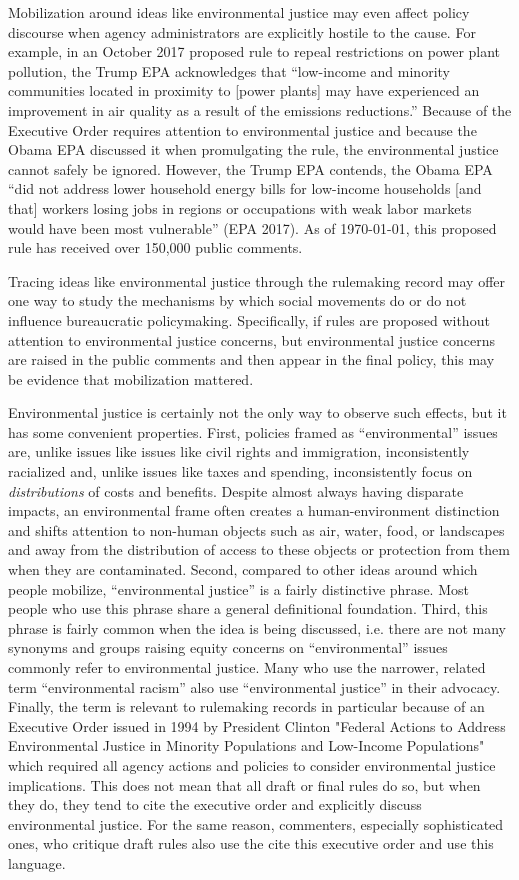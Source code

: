 Mobilization around ideas like environmental justice may even affect policy discourse when agency administrators are explicitly hostile to the cause. For example, in an October 2017 proposed rule to repeal restrictions on power plant pollution, the Trump EPA acknowledges that ``low-income and minority communities located in proximity to [power plants] may have experienced an improvement in air quality as a result of the emissions reductions.'' Because of the Executive Order requires attention to environmental justice and because the Obama EPA discussed it when promulgating the rule, the environmental justice cannot safely be ignored. However,  the Trump EPA contends, the Obama EPA ``did not address lower household energy bills for low-income households [and that] workers losing jobs in regions or occupations with weak labor markets would have been most vulnerable'' (EPA 2017). As of \today, this proposed rule has received over 150,000 public comments. 

Tracing ideas like environmental justice through the rulemaking record may offer one way to study the mechanisms by which social movements do or do not influence bureaucratic policymaking. Specifically, if rules are proposed without attention to environmental justice concerns, but environmental justice concerns are raised in the public comments and then appear in the final policy, this may be evidence that mobilization mattered.

Environmental justice is certainly not the only way to observe such effects, but it has some convenient properties. First, policies framed as ``environmental'' issues are, unlike issues like issues like civil rights and immigration, inconsistently racialized and, unlike issues like taxes and spending, inconsistently focus on \textit{distributions} of costs and benefits. Despite almost always having disparate impacts, an environmental frame often creates a human-environment distinction and shifts attention to non-human objects such as air, water, food, or landscapes and away from the distribution of access to these objects or protection from them when they are contaminated. Second, compared to other ideas around which people mobilize, ``environmental justice'' is a fairly distinctive phrase. Most people who use this phrase share a general definitional foundation. Third, this phrase is fairly common when the idea is being discussed, i.e. there are not many synonyms and groups raising equity concerns on ``environmental'' issues commonly refer to environmental justice.  Many who use the narrower, related term ``environmental racism'' also use ``environmental justice'' in their advocacy.  Finally, the term is relevant to rulemaking records in particular because of an Executive Order issued in 1994 by President Clinton "Federal Actions to Address Environmental Justice in Minority Populations and Low-Income Populations" which required all agency actions and policies to consider environmental justice implications. This does not mean that all draft or final rules do so, but when they do, they tend to cite the executive order and explicitly discuss environmental justice. For the same reason, commenters, especially sophisticated ones, who critique draft rules also use the cite this executive order and use this language. 

